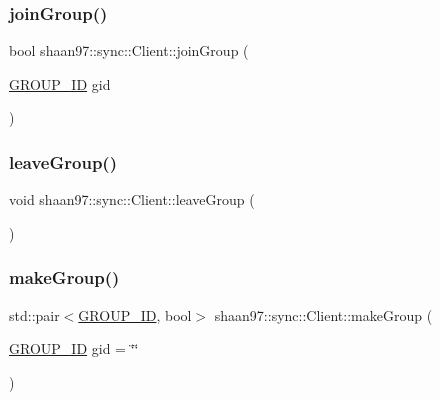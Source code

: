 \subsubsection{\texorpdfstring{join\+Group()}{joinGroup()}}
{\footnotesize\ttfamily bool shaan97\+::sync\+::\+Client\+::join\+Group (\begin{DoxyParamCaption}\item[{\hyperlink{namespaceshaan97_1_1sync_a34cebf175d27dfc3d82f24608f7043c1}{G\+R\+O\+U\+P\+\_\+\+ID}}]{gid }\end{DoxyParamCaption})}

\mbox{\label{classshaan97_1_1sync_1_1_client_a9822f9f083442f323a8eda5cbe530523}} 
\subsubsection{\texorpdfstring{leave\+Group()}{leaveGroup()}}
{\footnotesize\ttfamily void shaan97\+::sync\+::\+Client\+::leave\+Group (\begin{DoxyParamCaption}{ }\end{DoxyParamCaption})}

\mbox{\label{classshaan97_1_1sync_1_1_client_a94a60773fd7d212132f44661acac59c7}} 
\subsubsection{\texorpdfstring{make\+Group()}{makeGroup()}}
{\footnotesize\ttfamily std\+::pair$<$\hyperlink{namespaceshaan97_1_1sync_a34cebf175d27dfc3d82f24608f7043c1}{G\+R\+O\+U\+P\+\_\+\+ID}, bool$>$ shaan97\+::sync\+::\+Client\+::make\+Group (\begin{DoxyParamCaption}\item[{\hyperlink{namespaceshaan97_1_1sync_a34cebf175d27dfc3d82f24608f7043c1}{G\+R\+O\+U\+P\+\_\+\+ID}}]{gid = {\ttfamily \char`\"{}\char`\"{}} }\end{DoxyParamCaption})}

\mbox{\label{classshaan97_1_1sync_1_1_client_a807d5ec3cc4cc0bcc3d5dec72fc3af06}} 
